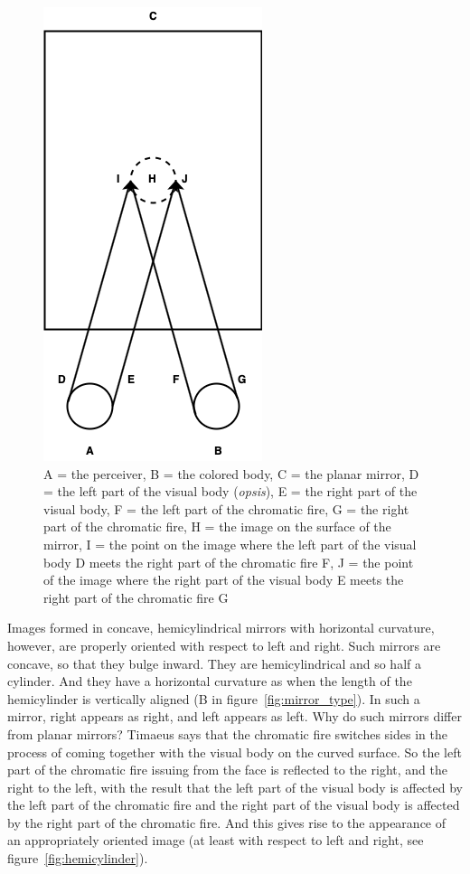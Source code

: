 \begin{figure}[htbp]
	\centering
		\includegraphics[scale=0.4]{graphics/transform-2.png}
	\caption{A = the perceiver, B = the colored body, C = the planar mirror, D = the left part of the visual body (\emph{opsis}), E = the right part of the visual body, F = the left part of the chromatic fire, G = the right part of the chromatic fire, H = the image on the surface of the mirror, I = the point on the image where the left part of the visual body D meets the right part of the chromatic fire F, J = the point of the image where the right part of the visual body E meets the right part of the chromatic fire G}
	\label{fig:transform}
\end{figure}

Images formed in concave, hemicylindrical mirrors with horizontal curvature, however, are properly oriented with respect to left and right. Such mirrors are concave, so that they bulge inward. They are hemicylindrical and so half a cylinder. And they have a horizontal curvature as when the length of the hemicylinder is vertically aligned (B in figure~\ref{fig:mirror_type}). In such a mirror, right appears as right, and left appears as left. Why do such mirrors differ from planar mirrors? Timaeus says that the chromatic fire switches sides in the process of coming together with the visual body on the curved surface. So the left part of the chromatic fire issuing from the face is reflected to the right, and the right to the left, with the result that the left part of the visual body is affected by the left part of the chromatic fire and the right part of the visual body is affected by the right part of the chromatic fire. And this gives rise to the appearance of an appropriately oriented image (at least with respect to left and right, see figure~\ref{fig:hemicylinder}).

